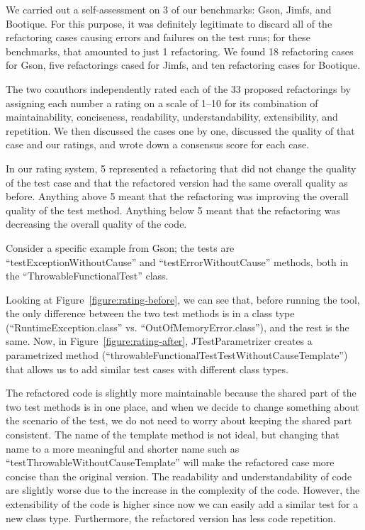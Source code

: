 We carried out a self-assessment on 3 of our benchmarks: Gson, Jimfs, and Bootique. For this purpose, it was definitely legitimate to discard all of the refactoring cases causing errors and failures on the test runs; for these benchmarks, that amounted to just 1 refactoring. We found 18 refactoring cases for Gson, five refactorings cased for Jimfs, and ten refactoring cases for Bootique.

The two coauthors independently rated each of the 33 proposed refactorings by assigning each number a rating on a scale of 1--10 for its combination of maintainability, conciseness, readability, understandability, extensibility, and repetition. We then discussed the cases one by one, discussed the quality of that case and our ratings, and wrote down a consensus score for each case.

In our rating system, 5 represented a refactoring that did not change the quality of the test case and that the refactored version had the same overall quality as before. Anything above 5 meant that the refactoring was improving the overall quality of the test method. Anything below 5 meant that the refactoring was decreasing the overall quality of the code.

Consider a specific example from Gson; the tests are ``testExceptionWithoutCause'' and ``testErrorWithoutCause'' methods, both in the ``ThrowableFunctionalTest'' class.

Looking at Figure~\ref{figure:rating-before}, we can see that, before running the tool, the only difference between the two test methods is in a class type (``RuntimeException.class'' vs. ``OutOfMemoryError.class''), and the rest is the same. Now, in Figure~\ref{figure:rating-after}, JTestParametrizer creates a parametrized method (``throwableFunctionalTestTestWithoutCauseTemplate'') that allows us to add similar test cases with different class types.

The refactored code is slightly more maintainable because the shared part of the two test methods is in one place, and when we decide to change something about the scenario of the test, we do not need to worry about keeping the shared part consistent.
The name of the template method is not ideal, but changing that name to a more meaningful and shorter name such as ``testThrowableWithoutCauseTemplate'' will make the refactored case more concise than the original version.
The readability and understandability of code are slightly worse due to the increase in the complexity of the code.
However, the extensibility of the code is higher since now we can easily add a similar test for a new class type. Furthermore, the refactored version has less code repetition.

